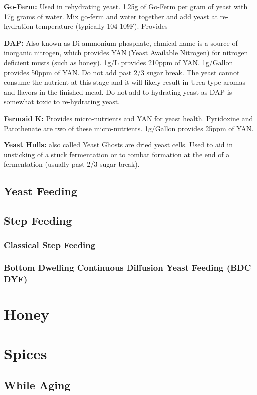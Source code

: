 \documentclass{article}
\begin{document}
  \textbf{Go-Ferm:} Used in rehydrating yeast. 1.25g of Go-Ferm per gram of yeast with 17g grams of water. Mix go-ferm and water together and add yeast at re-hydration temperature (typically 104-109F). Provides 

  \textbf{DAP:} Also known as Di-ammonium phosphate, chmical name  is a source of inorganic nitrogen, which provides YAN (Yeast Available Nitrogen) for nitrogen deficient musts (such as honey). 1g/L provides 210ppm of YAN. 1g/Gallon provides 50ppm of YAN. Do not add past 2/3 sugar break. The yeast cannot consume the nutrient at this stage and it will likely result in Urea type aromas and flavors in the finished mead. Do not add to hydrating yeast as DAP is somewhat toxic to re-hydrating yeast.

  \textbf{Fermaid K:} Provides micro-nutrients and YAN for yeast health. Pyridoxine and Patothenate are two of these micro-nutrients. 1g/Gallon provides 25ppm of YAN.

  \textbf{Yeast Hulls:} also called Yeast Ghosts are dried yeast cells. Used to aid in unsticking of a stuck fermentation or to combat  formation at the end of a fermentation (usually past 2/3 sugar break).
  
 \subsection{Yeast Feeding}
 \subsection{Step Feeding}
  \subsubsection{Classical Step Feeding}
  \subsubsection{Bottom Dwelling Continuous Diffusion Yeast Feeding (BDC DYF)}

\section{Honey}

\section{Spices}
 \subsection{While Aging}
\end{document}
